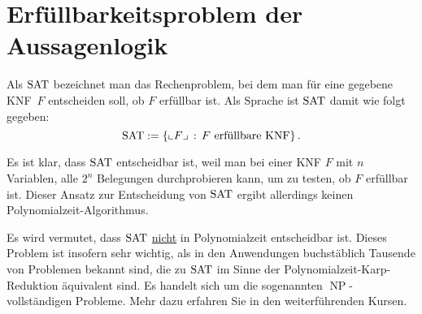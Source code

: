 \section{Erfüllbarkeitsproblem der Aussagenlogik}

\begin{defn}
	Als $\operatorname{SAT}$ bezeichnet man das Rechenproblem, bei dem man für eine gegebene KNF~$F$ entscheiden soll, ob $F$ erfüllbar ist. Als Sprache ist $\operatorname{SAT}$ damit wie folgt gegeben: 
	\[
		\operatorname{SAT} := \left\{ {\llcorner F\lrcorner} \,:\, F \ \text{erfüllbare KNF} \right\}.
	\]
\end{defn} 

\begin{bem}
	Es ist klar, dass $\operatorname{SAT}$ entscheidbar ist, weil man bei einer KNF $F$ mit $n$ Variablen, alle $2^n$ Belegungen durchprobieren kann, um zu testen, ob $F$ erfüllbar ist. Dieser Ansatz zur Entscheidung von $\operatorname{SAT}$ ergibt allerdings keinen Polynomialzeit-Algorithmus. 
\end{bem} 

\begin{bem}
	Es wird vermutet, dass $\operatorname{SAT}$ \underline{nicht} in Polynomialzeit entscheidbar ist. Dieses Problem ist insofern sehr wichtig, als in den Anwendungen buchstäblich Tausende von Problemen bekannt sind, die zu $\operatorname{SAT}$ im Sinne der Polynomialzeit-Karp-Reduktion äquivalent sind. Es handelt sich um die sogenannten $\operatorname{NP}$-vollständigen Probleme. Mehr dazu erfahren Sie in den weiterführenden Kursen. 
\end{bem} 

